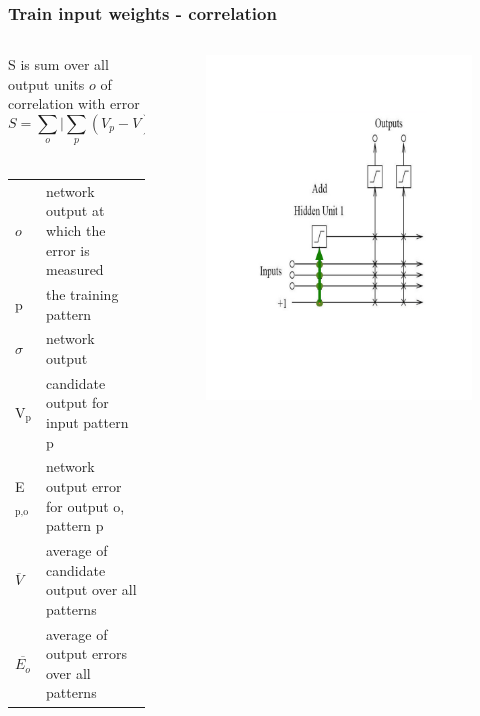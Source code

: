 \documentclass[presentation]{beamer}
\begin{document}
\begin{frame}
  \frametitle{Train input weights - correlation}
	\begin{columns}[t]
		\begin{column}[t]{0.5\textwidth}
      \small{S is sum over all output units $\mathit{o}$ of correlation with error}
      $$ S = \sum_{o} \lvert \sum_{p} (V_{p} - V) (E_{p,o} - E_{o}) \rvert $$
     \\  
      \begin{center}
        \begin{tabular}{ll}
          \(\mathit{o}\) & \tiny{network output at which the error is measured} \\
          p & \tiny{the training pattern} \\
          \(\sigma\) & \tiny{network output} \\
          V\(_{\text{p}}\) & \tiny{candidate output for input pattern p}   \\
          E\(_{\text{p,o}}\) & \tiny{network output error for output o, pattern p} \\
          \(\overline{V}\) & \tiny{average of candidate output over all patterns} \\
          \(\overline{E_{o}}\) & \tiny{average of output errors over all patterns} \\
        \end{tabular}
      \end{center}
		\end{column}
		\begin{column}{0.5\textwidth}
      \begin{figure}
        \centering
        \includegraphics[scale=0.3]{trainInputunit.png}

\end{figure}
\end{column}
\end{columns}
\end{frame}
\end{document}
